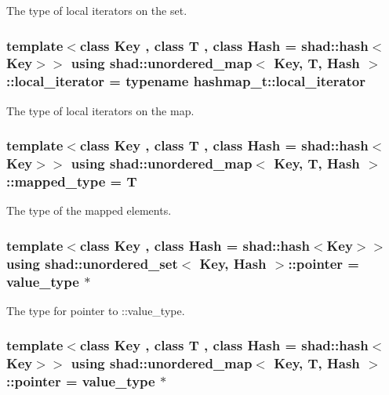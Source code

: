 The type of local iterators on the set. 

\hypertarget{group__Types_ga520d395c30b2b19179153108ea694cec}{
\subsubsection[{local\-\_\-iterator}]{\setlength{\rightskip}{0pt plus 5cm}template$<$class Key , class T , class Hash  = shad\-::hash$<$\-Key$>$$>$ using {\bf shad\-::unordered\-\_\-map}$<$ Key, T, Hash $>$\-::local\-\_\-iterator =  typename hashmap\-\_\-t\-::local\-\_\-iterator}}\label{group__Types_ga520d395c30b2b19179153108ea694cec}


The type of local iterators on the map. 

\hypertarget{group__Types_ga146f53b5d4191c21deed1bd89683d4bf}{
\subsubsection[{mapped\-\_\-type}]{\setlength{\rightskip}{0pt plus 5cm}template$<$class Key , class T , class Hash  = shad\-::hash$<$\-Key$>$$>$ using {\bf shad\-::unordered\-\_\-map}$<$ Key, T, Hash $>$\-::mapped\-\_\-type =  T}}\label{group__Types_ga146f53b5d4191c21deed1bd89683d4bf}


The type of the mapped elements. 

\hypertarget{group__Types_ga84503e3a7375cd54f32da739fe21ecc9}{
\subsubsection[{pointer}]{\setlength{\rightskip}{0pt plus 5cm}template$<$class Key , class Hash  = shad\-::hash$<$\-Key$>$$>$ using {\bf shad\-::unordered\-\_\-set}$<$ Key, Hash $>$\-::pointer =  value\-\_\-type $\ast$}}\label{group__Types_ga84503e3a7375cd54f32da739fe21ecc9}


The type for pointer to \-::value\-\_\-type. 

\hypertarget{group__Types_ga94466a187a2da262cb5b58356c3ac24c}{
\subsubsection[{pointer}]{\setlength{\rightskip}{0pt plus 5cm}template$<$class Key , class T , class Hash  = shad\-::hash$<$\-Key$>$$>$ using {\bf shad\-::unordered\-\_\-map}$<$ Key, T, Hash $>$\-::pointer =  value\-\_\-type $\ast$}}\label{group__Types_ga94466a187a2da262cb5b58356c3ac24c}



